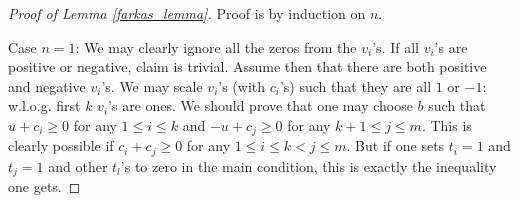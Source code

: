 \begin{proof}[Proof of Lemma \ref{farkas_lemma}]
	Proof is by induction on $n$.

	Case $n = 1$: We may clearly ignore all the zeros from the $v_{i}$'s. If all $v_{i}$'s are positive or negative, claim is trivial. Assume then that there are both positive and negative $v_{i}$'s. We may scale $v_{i}$'s (with $c_{i}$'s) such that they are all $1$ or $-1$: w.l.o.g. first $k$ $v_{i}$'s are ones. We should prove that one may choose $b$ such that $u + c_{i} \geq 0$ for any $1 \leq i \leq k$ and $-u + c_{j} \geq 0$ for any $k + 1 \leq j \leq m$. This is clearly possible if $c_{i} + c_{j} \geq 0$ for any $1 \leq i \leq k < j \leq m$. But if one sets $t_{i} = 1$ and $t_{j} = 1$ and other $t_{l}$'s to zero in the main condition, this is exactly the inequality one gets.


\end{proof}
